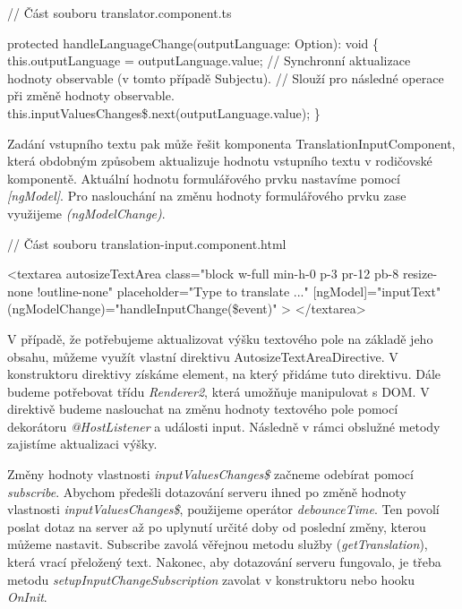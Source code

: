 \begin{prog}
// Část souboru translator.component.ts

protected handleLanguageChange(outputLanguage: Option): void \{
  this.outputLanguage = outputLanguage.value;
  // Synchronní aktualizace hodnoty observable (v tomto případě Subjectu).
  // Slouží pro následné operace při změně hodnoty observable.
  this.inputValuesChanges\$.next(outputLanguage.value);
\}
\end{prog}

Zadání vstupního textu pak může řešit komponenta TranslationInputComponent, která obdobným způsobem aktualizuje hodnotu vstupního textu v rodičovské komponentě. 
Aktuální hodnotu formulářového prvku nastavíme pomocí \emph{[ngModel]}. Pro naslouchání na změnu hodnoty formulářového prvku zase využijeme \emph{(ngModelChange)}.

\begin{prog}
// Část souboru translation-input.component.html

<textarea
  autosizeTextArea
  class="block w-full min-h-0 p-3 pr-12 pb-8 resize-none !outline-none"
  placeholder="Type to translate ..."
  [ngModel]="inputText"
  (ngModelChange)="handleInputChange(\$event)"
>
</textarea>
\end{prog}

V případě, že potřebujeme aktualizovat výšku textového pole na základě jeho obsahu, můžeme využít vlastní direktivu AutosizeTextAreaDirective. 
V konstruktoru direktivy získáme element, na který přidáme tuto direktivu. Dále budeme potřebovat třídu \emph{Renderer2}, která umožňuje manipulovat s DOM. 
V direktivě budeme naslouchat na změnu hodnoty textového pole pomocí dekorátoru \emph{@HostListener} a události input. Následně v rámci obslužné metody zajistíme aktualizaci výšky.

Změny hodnoty vlastnosti \emph{inputValuesChanges\$} začneme odebírat pomocí \emph{subscribe}. 
Abychom předešli dotazování serveru ihned po změně hodnoty vlastnosti \emph{inputValuesChanges\$}, použijeme operátor \emph{debounceTime}. 
Ten povolí poslat dotaz na server až po uplynutí určité doby od poslední změny, kterou můžeme nastavit. 
Subscribe zavolá věřejnou metodu služby (\emph{getTranslation}), která vrací přeložený text. 
Nakonec, aby dotazování serveru fungovalo, je třeba metodu \emph{setupInputChangeSubscription} zavolat v konstruktoru nebo hooku \emph{OnInit}.

